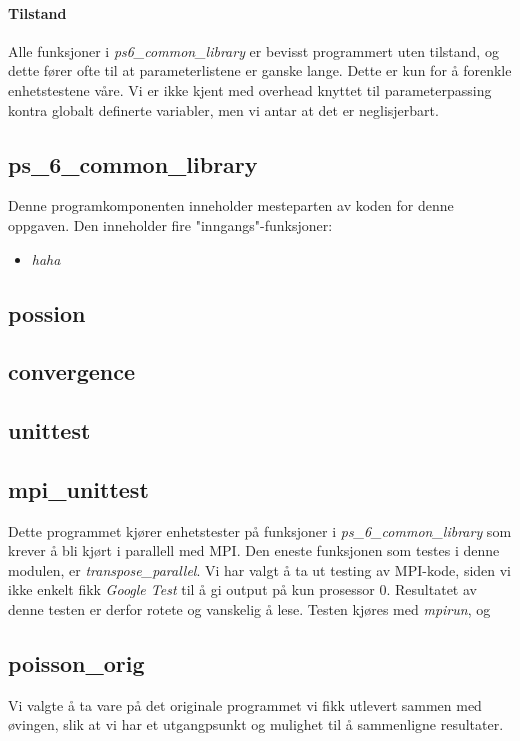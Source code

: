 \documentclass{article}
\begin{document}
\paragraph{Tilstand}
Alle funksjoner i \emph{ps6\_common\_library} er bevisst programmert uten tilstand, og dette fører ofte til at parameterlistene er ganske lange. Dette er kun for å forenkle enhetstestene våre. Vi er ikke kjent med overhead knyttet til parameterpassing kontra globalt definerte variabler, men vi antar at det er neglisjerbart.

\subsection{ps\_6\_common\_library}
Denne programkomponenten inneholder mesteparten av koden for denne oppgaven. Den inneholder fire "inngangs"-funksjoner:
\begin{itemize}
	\item \emph{haha}
\end{itemize}

\subsection{possion}

\subsection{convergence}

\subsection{unittest}
\label{subsection:unittest}

\subsection{mpi\_unittest}
\label{subsection:mpi_unittest}
Dette programmet kjører enhetstester på funksjoner i \emph{ps\_6\_common\_library} som krever å bli kjørt i parallell med MPI. Den eneste funksjonen som testes i denne modulen, er \emph{transpose\_parallel}. Vi har valgt å ta ut testing av MPI-kode, siden vi ikke enkelt fikk \emph{Google Test} til å gi output på kun prosessor 0. Resultatet av denne testen er derfor rotete og vanskelig å lese. Testen kjøres med \emph{mpirun}, og 

\subsection{poisson\_orig}
Vi valgte å ta vare på det originale programmet vi fikk utlevert sammen med øvingen, slik at vi har et utgangpsunkt og mulighet til å sammenligne resultater.
\end{document}
